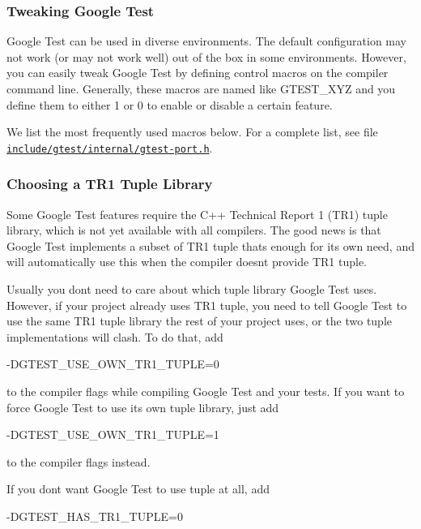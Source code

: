 \subsubsection*{Tweaking Google Test}

Google Test can be used in diverse environments. The default configuration may not work (or may not work well) out of the box in some environments. However, you can easily tweak Google Test by defining control macros on the compiler command line. Generally, these macros are named like {\ttfamily G\+T\+E\+S\+T\+\_\+\+X\+YZ} and you define them to either 1 or 0 to enable or disable a certain feature.

We list the most frequently used macros below. For a complete list, see file \href{include/gtest/internal/gtest-port.h}{\tt include/gtest/internal/gtest-\/port.\+h}.

\subsubsection*{Choosing a T\+R1 Tuple Library}

Some Google Test features require the C++ Technical Report 1 (T\+R1) tuple library, which is not yet available with all compilers. The good news is that Google Test implements a subset of T\+R1 tuple that\textquotesingle{}s enough for its own need, and will automatically use this when the compiler doesn\textquotesingle{}t provide T\+R1 tuple.

Usually you don\textquotesingle{}t need to care about which tuple library Google Test uses. However, if your project already uses T\+R1 tuple, you need to tell Google Test to use the same T\+R1 tuple library the rest of your project uses, or the two tuple implementations will clash. To do that, add \begin{DoxyVerb}-DGTEST_USE_OWN_TR1_TUPLE=0
\end{DoxyVerb}


to the compiler flags while compiling Google Test and your tests. If you want to force Google Test to use its own tuple library, just add \begin{DoxyVerb}-DGTEST_USE_OWN_TR1_TUPLE=1
\end{DoxyVerb}


to the compiler flags instead.

If you don\textquotesingle{}t want Google Test to use tuple at all, add \begin{DoxyVerb}-DGTEST_HAS_TR1_TUPLE=0
\end{DoxyVerb}


